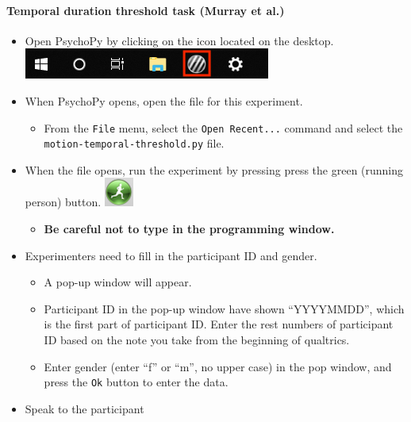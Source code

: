 \documentclass[]{article}
\providecommand{\tightlist}{%
  \setlength{\itemsep}{0pt}\setlength{\parskip}{0pt}}
\let\oldparagraph\paragraph
\renewcommand{\paragraph}[1]{\oldparagraph{#1}\mbox{}}
\begin{document}
\paragraph{Temporal duration threshold task (Murray et
al.)}\label{temporal-duration-threshold-task-murray-et-al.}

\begin{itemize}
\tightlist
\item
  Open PsychoPy by clicking on the icon located on the desktop.
  \includegraphics{images/PsychoPy-1.PNG}\\
\item
  When PsychoPy opens, open the file for this experiment.

  \begin{itemize}
  \tightlist
  \item
    From the \texttt{File} menu, select the \texttt{Open\ Recent...}
    command and select the \texttt{motion-temporal-threshold.py} file.
  \end{itemize}
\item
  When the file opens, run the experiment by pressing press the green
  (running person) button. \includegraphics{images/PPrunningMan.png}

  \begin{itemize}
  \tightlist
  \item
    \textbf{Be careful not to type in the programming window.}
  \end{itemize}
\item
  Experimenters need to fill in the participant ID and gender.

  \begin{itemize}
  \tightlist
  \item
    A pop-up window will appear.
  \item
    Participant ID in the pop-up window have shown ``YYYYMMDD'', which
    is the first part of participant ID. Enter the rest numbers of
    participant ID based on the note you take from the beginning of
    qualtrics.
  \item
    Enter gender (enter ``f'' or ``m'', no upper case) in the pop
    window, and press the \texttt{Ok} button to enter the data.
  \end{itemize}
\item
  Speak to the participant
\end{itemize}
\end{document}
